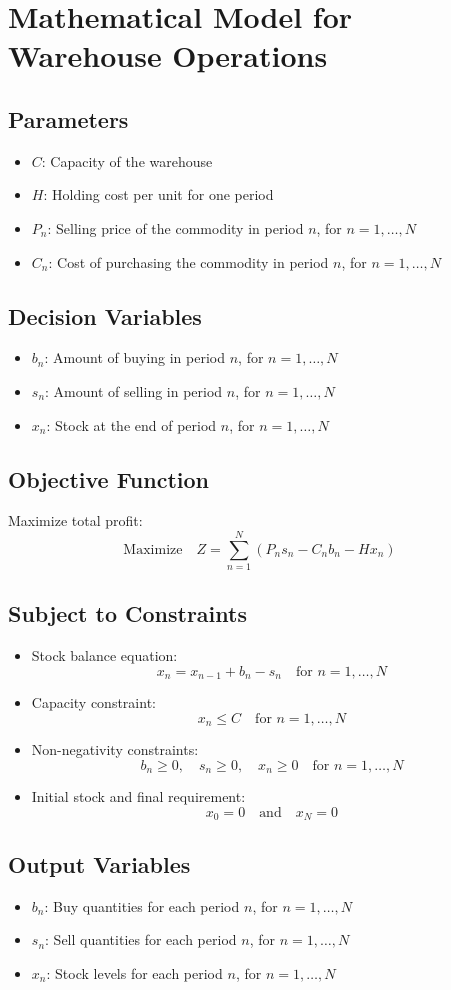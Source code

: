 \documentclass{article}
\begin{document}
\section*{Mathematical Model for Warehouse Operations}

\subsection*{Parameters}
\begin{itemize}
    \item $C$: Capacity of the warehouse
    \item $H$: Holding cost per unit for one period
    \item $P_n$: Selling price of the commodity in period $n$, for $n = 1, \ldots, N$
    \item $C_n$: Cost of purchasing the commodity in period $n$, for $n = 1, \ldots, N$
\end{itemize}

\subsection*{Decision Variables}
\begin{itemize}
    \item $b_n$: Amount of buying in period $n$, for $n = 1, \ldots, N$
    \item $s_n$: Amount of selling in period $n$, for $n = 1, \ldots, N$
    \item $x_n$: Stock at the end of period $n$, for $n = 1, \ldots, N$
\end{itemize}

\subsection*{Objective Function}
Maximize total profit:
\[
\text{Maximize} \quad Z = \sum_{n=1}^{N} (P_n s_n - C_n b_n - H x_n)
\]

\subsection*{Subject to Constraints}
\begin{itemize}
    \item Stock balance equation:
    \[
    x_n = x_{n-1} + b_n - s_n \quad \text{for } n = 1, \ldots, N
    \]
    \item Capacity constraint:
    \[
    x_n \leq C  \quad \text{for } n = 1, \ldots, N
    \]
    \item Non-negativity constraints:
    \[
    b_n \geq 0, \quad s_n \geq 0, \quad x_n \geq 0 \quad \text{for } n = 1, \ldots, N
    \]
    \item Initial stock and final requirement:
    \[
    x_0 = 0 \quad \text{and} \quad x_N = 0
    \]
\end{itemize}

\subsection*{Output Variables}
\begin{itemize}
    \item $b_n$: Buy quantities for each period $n$, for $n = 1, \ldots, N$
    \item $s_n$: Sell quantities for each period $n$, for $n = 1, \ldots, N$
    \item $x_n$: Stock levels for each period $n$, for $n = 1, \ldots, N$
\end{itemize}
\end{document}
